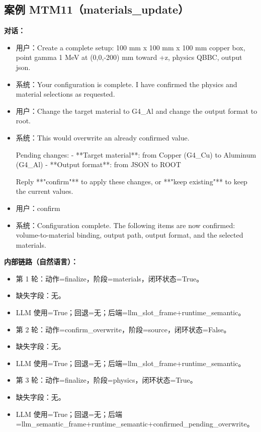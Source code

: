 \documentclass[11pt]{ctexart}
\begin{document}
\subsection{案例 MTM11（materials\_update）}
\textbf{对话：}
\begin{itemize}
\item 用户：Create a complete setup: 100 mm x 100 mm x 100 mm copper box, point gamma 1 MeV at (0,0,-200) mm toward +z, physics QBBC, output json.
\item 系统：Your configuration is complete. I have confirmed the physics and material selections as requested.
\item 用户：Change the target material to G4\_Al and change the output format to root.
\item 系统：This would overwrite an already confirmed value.

Pending changes:
- **Target material**: from Copper (G4\_Cu) to Aluminum (G4\_Al)
- **Output format**: from JSON to ROOT

Reply **"confirm"** to apply these changes, or **"keep existing"** to keep the current values.
\item 用户：confirm
\item 系统：Configuration complete. The following items are now confirmed: volume-to-material binding, output path, output format, and the selected materials.
\end{itemize}
\textbf{内部链路（自然语言）：}
\begin{itemize}
\item 第 1 轮：动作=finalize，阶段=materials，闭环状态=True。
\item 缺失字段：无。
\item LLM 使用=True；回退=无；后端=llm\_slot\_frame+runtime\_semantic。
\item 第 2 轮：动作=confirm\_overwrite，阶段=source，闭环状态=False。
\item 缺失字段：无。
\item LLM 使用=True；回退=无；后端=llm\_slot\_frame+runtime\_semantic。
\item 第 3 轮：动作=finalize，阶段=physics，闭环状态=True。
\item 缺失字段：无。
\item LLM 使用=True；回退=无；后端=llm\_semantic\_frame+runtime\_semantic+confirmed\_pending\_overwrite。
\end{itemize}
\end{document}

